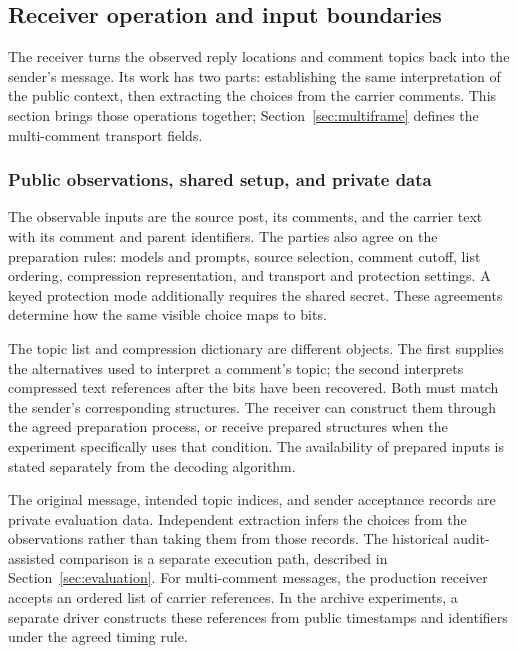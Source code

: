 \subsection{Receiver operation and input boundaries}
\label{sec:receiver-operation}

The receiver turns the observed reply locations and comment topics back into the sender's message. Its work has two parts: establishing the same interpretation of the public context, then extracting the choices from the carrier comments. This section brings those operations together; Section~\ref{sec:multiframe} defines the multi-comment transport fields.

\subsubsection{Public observations, shared setup, and private data}
The observable inputs are the source post, its comments, and the carrier text with its comment and parent identifiers. The parties also agree on the preparation rules: models and prompts, source selection, comment cutoff, list ordering, compression representation, and transport and protection settings. A keyed protection mode additionally requires the shared secret. These agreements determine how the same visible choice maps to bits.

The topic list and compression dictionary are different objects. The first supplies the alternatives used to interpret a comment's topic; the second interprets compressed text references after the bits have been recovered. Both must match the sender's corresponding structures. The receiver can construct them through the agreed preparation process, or receive prepared structures when the experiment specifically uses that condition. The availability of prepared inputs is stated separately from the decoding algorithm.

The original message, intended topic indices, and sender acceptance records are private evaluation data. Independent extraction infers the choices from the observations rather than taking them from those records. The historical audit-assisted comparison is a separate execution path, described in Section~\ref{sec:evaluation}. For multi-comment messages, the production receiver accepts an ordered list of carrier references. In the archive experiments, a separate driver constructs these references from public timestamps and identifiers under the agreed timing rule.

